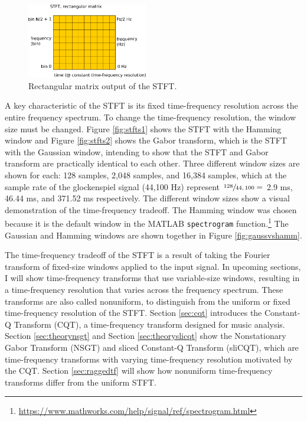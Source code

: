 \documentclass[report.tex]{subfiles}
\begin{document}
\begin{figure}[ht]
	\centering
	\includegraphics[width=0.4688\textwidth]{./images-blockdiagrams/stft_diag.png}
	\caption{Rectangular matrix output of the STFT.}
	\label{fig:stftdiag}
\end{figure}

A key characteristic of the STFT is its fixed time-frequency resolution across the entire frequency spectrum. To change the time-frequency resolution, the window size must be changed. Figure \ref{fig:stfts1} shows the STFT with the Hamming window and Figure \ref{fig:stfts2} shows the Gabor transform, which is the STFT with the Gaussian window, intending to show that the STFT and Gabor transform are practically identical to each other. Three different window sizes are shown for each: 128 samples, 2,048 samples, and 16,384 samples, which at the sample rate of the glockenspiel signal (44,100 Hz) represent $\sfrac{128}{44,100} =$ 2.9 ms, 46.44 ms, and 371.52 ms respectively. The different window sizes show a visual demonstration of the time-frequency tradeoff. The Hamming window was chosen because it is the default window in the MATLAB \Verb#spectrogram# function.\footnote{\url{https://www.mathworks.com/help/signal/ref/spectrogram.html}} The Gaussian and Hamming windows are shown together in Figure \ref{fig:gaussvshamm}.

The time-frequency tradeoff of the STFT is a result of taking the Fourier transform of fixed-size windows applied to the input signal. In upcoming sections, I will show time-frequency transforms that use variable-size windows, resulting in a time-frequency resolution that varies across the frequency spectrum. These transforms are also called nonuniform, to distinguish from the uniform or fixed time-frequency resolution of the STFT. Section \ref{sec:cqt} introduces the Constant-Q Transform (CQT), a time-frequency transform designed for music analysis. Section \ref{sec:theorynsgt} and Section \ref{sec:theoryslicqt} show the Nonstationary Gabor Transform (NSGT) and sliced Constant-Q Transform (sliCQT), which are time-frequency transforms with varying time-frequency resolution motivated by the CQT. Section \ref{sec:raggedtf} will show how nonuniform time-frequency transforms differ from the uniform STFT.
\end{document}
